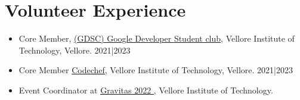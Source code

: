 \documentclass[letterpaper,10pt]{article}
\newcommand{\resumeItem}[1]{
  \item\small{
    {#1 \vspace{-2pt}}
  }
}
\newcommand{\resumeSubItem}[1]{\resumeItem{#1}\vspace{-4pt}}
\newcommand{\resumeSubHeadingListStart}{\begin{itemize}[leftmargin=0.15in, label={}]}
\newcommand{\resumeSubHeadingListEnd}{\end{itemize}}
\begin{document}
%

\section{Volunteer Experience}
  \resumeSubHeadingListStart
  \resumeSubItem
      {Core Member, \href{https://www.linkedin.com/company/dscvit/}{\underline{(GDSC) Google Developer Student club}}, Vellore Institute of Technology, Vellore.  2021|2023}
    \resumeSubItem
      {Core Member \href{https://www.linkedin.com/company/codechefvit/}{\underline{Codechef}}, Vellore Institute of Technology, Vellore. 2021|2023}
    \resumeSubItem
      {Event Coordinator at \href{https://www.linkedin.com/company/gravitas-vit/}{\underline{ Gravitas 2022 }}, Vellore Institute of Technology.}
  \resumeSubHeadingListEnd
\end{document}
